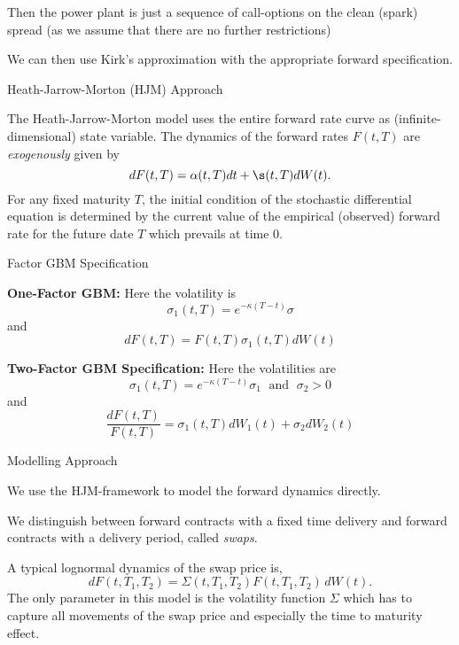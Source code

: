 	Then the power plant is just a sequence of call-options on the clean (spark) spread
(as we assume that there are no further restrictions)


	We can then use Kirk's approximation with the appropriate forward specification.





{Heath-Jarrow-Morton (HJM) Approach}

The Heath-Jarrow-Morton model uses the entire forward rate curve as
(infinite-dimensional) state variable. The dynamics of the forward rates $F(t,T)$ are {\it exogenously} given by
$$
dF(t,T) = \alpha(t,T) dt + \s(t,T) dW(t).
$$
For any fixed maturity $T$, the
initial condition of the stochastic differential equation
is determined by the current value
of the empirical (observed) forward rate for the future date $T$
which prevails at time $0$.

{Factor GBM Specification}






	{\bf One-Factor GBM:} Here the volatility is
$$
\sigma_1(t,T)=e^{-\kappa (T-t)}\sigma
$$
and
$$
dF(t,T)=F(t,T)\sigma_1(t,T)dW(t)
$$


	{\bf Two-Factor GBM Specification:}
Here the volatilities are
$$
\sigma_1(t,T)=e^{-\kappa (T-t)}\sigma_1 \; \mbox{ and } \; \sigma_2>0
$$
and
$$
\frac{dF(t,T)}{F(t,T)}=\sigma_1(t,T)dW_1(t)+\sigma_2dW_2(t)
$$





{Modelling Approach}






	We use the HJM-framework to model the forward dynamics directly.


	We distinguish between forward contracts with a fixed time delivery and forward contracts with a delivery period, called \emph{swaps}.


	A typical lognormal dynamics of the swap price is,
\begin{equation}
dF(t,T_1,T_2)=\Sigma(t,T_1,T_2)F(t,T_1,T_2)\, dW(t). \label{eqn: lognormal dynamics}
\end{equation}
The only parameter in this model is the volatility function $\Sigma$ which has to capture all movements of the swap price and especially the time to maturity effect.



